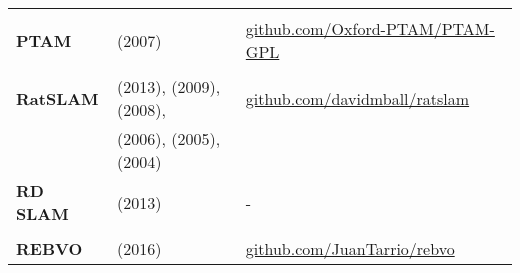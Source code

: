 \documentclass[a4paper,12pt]{scrartcl}
\begin{document}
{\begin{longtable}{l|l|l}
                                                                                                                                  &                                                                                            &   \\ [-3mm]
    \textbf{PTAM}                                                                                                                 & \cite{Klein2007} (2007)
                                                                                                                                  & {\href{https://github.com/Oxford-PTAM/PTAM-GPL}{github.com/Oxford-PTAM/PTAM-GPL}}         \\
                                                                                                                                  &                                                                                            &   \\ [-3mm]
    \textbf{RatSLAM}                                                                                                              & \cite{Ball2013} (2013), \cite{Maddern2009} (2009), \cite{Milford2008} (2008),
                                                                                                                                  & {\href{https://github.com/davidmball/ratslam}{github.com/davidmball/ratslam}}             \\
                                                                                                                                  & \cite{Milford2006} (2006), \cite{Milford2005} (2005), \cite{Milford2004} (2004)            &   \\
    \textbf{RD SLAM}                                                                                                              & \cite{Tan2013a} (2013)                                                                     & - \\
                                                                                                                                  &                                                                                            &   \\ [-3mm]
    \textbf{REBVO}                                                                                                                & \cite{Tarrio2016} (2016)
                                                                                                                                  & {\href{https://github.com/JuanTarrio/rebvo}{github.com/JuanTarrio/rebvo}}                 \\

\end{longtable}}
\end{document}
